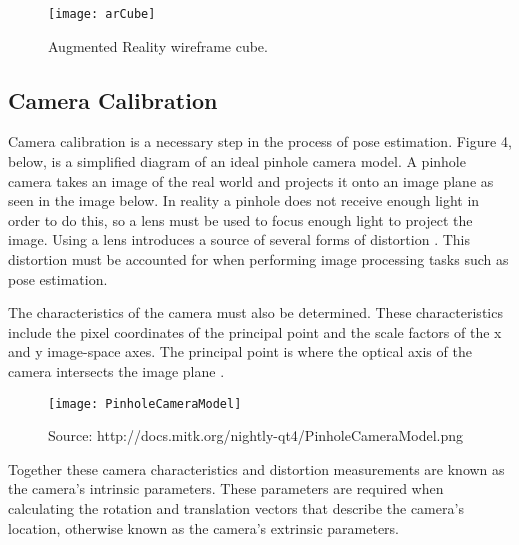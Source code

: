 \documentclass{article}
\begin{document}
\begin{figure}[H]
\begin{center}
\texttt{[image: arCube]} 
\caption{Augmented Reality wireframe cube.}
\end{center}
\end{figure}

\subsection{Camera Calibration}

Camera calibration is a necessary step in the process of pose estimation. Figure 4, below, is a simplified diagram of an ideal pinhole camera model. A pinhole camera takes an image of the real world and projects it onto an image plane \cite{pinhole} as seen in the image below. In reality a pinhole does not receive enough light in order to do this, so a lens must be used to focus enough light to project the image. Using a lens introduces a source of several forms of distortion \cite{calib1}. This distortion must be accounted for when performing image processing tasks such as pose estimation. \par

The characteristics of the camera must also be determined. These characteristics include the pixel coordinates of the principal point and the scale factors of the x and y image-space axes. The principal point is where the optical axis of the camera intersects the image plane \cite{wikicalib}.

\vspace*{2\baselineskip}

\begin{figure}[H]
\begin{center}
\texttt{[image: PinholeCameraModel]}
\caption{Source: http://docs.mitk.org/nightly-qt4/PinholeCameraModel.png}
\end{center}
\end{figure}

Together these camera characteristics and distortion measurements are known as the camera's intrinsic parameters. These parameters are required when calculating the rotation and translation vectors that describe the camera's location, otherwise known as the camera's extrinsic parameters. \par
\end{document}
